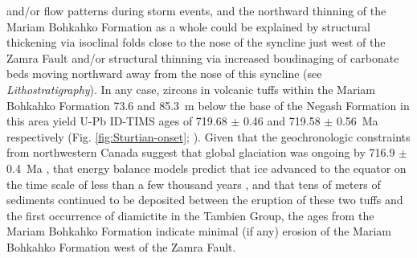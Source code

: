 and/or flow patterns during storm events, and the northward thinning of the Mariam Bohkahko Formation as a whole could be explained by structural thickening via isoclinal folds close to the nose of the syncline just west of the Zamra Fault and/or structural thinning via increased boudinaging of carbonate beds moving northward away from the nose of this syncline (see \textit{Lithostratigraphy}). In any case, zircons in volcanic tuffs within the Mariam Bohkahko Formation 73.6 and 85.3~m below the base of the Negash Formation in this area yield U-Pb ID-TIMS ages of 719.68 $\pm$ 0.46 and 719.58 $\pm$ 0.56~Ma respectively (Fig. \ref{fig:Sturtian-onset}; \citealp{MacLennan2018a}). Given that the geochronologic constraints from northwestern Canada suggest that global glaciation was ongoing by 716.9 $\pm$ 0.4~Ma \citep{Macdonald2018a}, that energy balance models predict that ice advanced to the equator on the time scale of less than a few thousand years \citep{Baum2001a, Hoffman2002a, Pollard2005a}, and that tens of meters of sediments continued to be deposited between the eruption of these two tuffs and the first occurrence of diamictite in the Tambien Group, the ages from the Mariam Bohkahko Formation indicate minimal (if any) erosion of the Mariam Bohkahko Formation west of the Zamra Fault.

